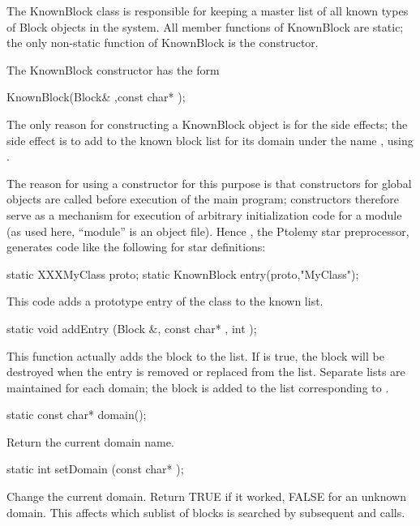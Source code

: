 The KnownBlock class is responsible for keeping a master list of all
known types of Block objects in the system.  All member functions of
KnownBlock are static; the only non-static function of KnownBlock is
the constructor.

The KnownBlock constructor has the form

\begin{example}
KnownBlock(Block& ,const char* );
\end{example}

The only reason for constructing a KnownBlock object is for the side
effects; the side effect is to add  to the known block list
for its domain under the name , using .

The reason for using a constructor for this purpose is that constructors
for global objects are called before execution of the main program;
constructors therefore serve as a mechanism for execution of arbitrary
initialization code for a module (as used here, ``module'' is an object
file).  Hence , the Ptolemy star preprocessor, generates
code like the following for star definitions:

\begin{example}
static XXXMyClass proto;
static KnownBlock entry(proto,"MyClass");
\end{example}

This code adds a prototype entry of the class to the known list.

\begin{example}
static void addEntry (Block &, const char* , int );
\end{example}

This function actually adds the block to the list.  If  is true,
the block will be destroyed when the entry is removed or replaced from
the list.  Separate lists are maintained for each domain; the block
is added to the list corresponding to .

\begin{example}
static const char* domain();
\end{example}

Return the current domain name.

\begin{example}
static int setDomain (const char* );
\end{example}

Change the current domain.  Return TRUE if it worked, FALSE for an
unknown domain.  This affects which sublist of blocks is searched by
subsequent  and  calls.

